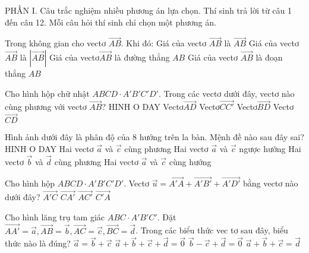 PHẦN I. Câu trắc nghiệm nhiều phương án lựa chọn. Thí sinh trả lời từ câu 1 đến câu 12. Mỗi câu hỏi 
 thí sinh chỉ chọn một phương án.
\begin{ex}
Trong không gian cho vectơ $\vec{AB}$. Khi đó:
\choice
{Giá của vectơ $\vec{AB}$ là $\vec{AB}$}
{Giá của vectơ$\vec{AB}$ là $\left| \vec{AB} \right|$}
{\True Giá của vectơ$\vec{AB}$ là đường thẳng $AB$}
{Giá của vectơ $\vec{AB}$ là đoạn thẳng $AB$}
\end{ex}
\begin{ex}
 Cho hình hộp chữ nhật $ABCD \cdot A'B'C'D'$. Trong các vectơ dưới đây, vectơ nào cùng phương với vectơ $\vec{AB}$?
{\centering\color{red} HINH O DAY}
\choice
{Vectơ$\vec{AD}$}
{Vectơ$\vec{CC'}$}
{Vectơ$\vec{BD}$}
{\True Vectơ$\vec{CD}$}
\end{ex}
\begin{ex}
 Hình ảnh dưới đây là phân độ của 8 hướng trên la bàn. Mệnh đề nào sau đây sai?
{\centering\color{red} HINH O DAY}
\choice
{Hai vectơ $\vec{a}$ và $\vec{c}$ cùng phương}
{Hai vectơ $\vec{a}$ và $\vec{c}$ ngược hướng}
{Hai vectơ $\vec{b}$ và $\vec{d}$ cùng phương}
{\True Hai vectơ $\vec{a}$ và $\vec{c}$ cùng hướng}
\end{ex}
\begin{ex}
 Cho hình hộp $ABCD \cdot A'B'C'D'$. Vectơ $\vec{u}=\vec{A'A}+\vec{A'B'}+\vec{A'D'}$ bằng vectơ nào dưới đây?
\choice
{\True $\vec{A'C}$}
{$\vec{CA'}$}
{$\vec{AC'}$}
{$\vec{C'A}$}
\end{ex}
\begin{ex}
 Cho hình lăng trụ tam giác $ABC \cdot A'B'C'$. Đặt $\vec{AA'}=\vec{a},\vec{AB}=\vec{b},\vec{AC}=\vec{c},\vec{BC}=\vec{d}$. Trong các biểu thức vec tơ sau đây, biểu thức nào là đúng?
\choice
{$\vec{a}=\vec{b}+\vec{c}$}
{$\vec{a}+\vec{b}+\vec{c}+\vec{d}=\vec{0}$}
{\True $\vec{b}-\vec{c}+\vec{d}=\vec{0}$}
{$\vec{a}+\vec{b}+\vec{c}=\vec{d}$}
\end{ex}
